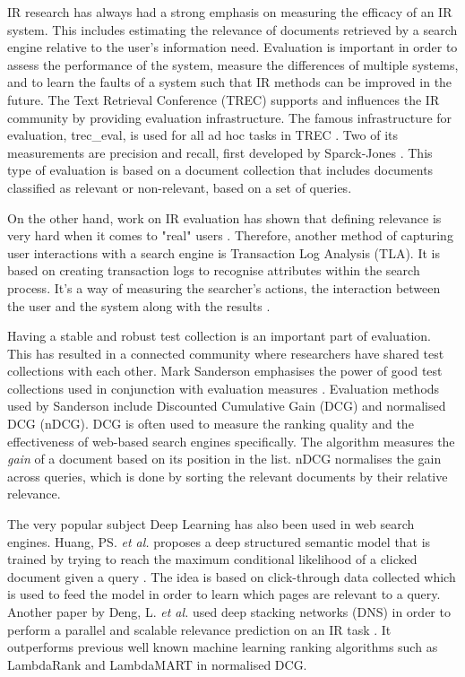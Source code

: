 IR research has always had a strong emphasis on measuring the efficacy of an IR system. This includes estimating the relevance of documents retrieved by a search engine relative to the user's information need. Evaluation is important in order to assess the performance of the system, measure the differences of multiple systems, and to learn the faults of a system such that IR methods can be improved in the future. The Text Retrieval Conference (TREC) supports and influences the IR community by providing evaluation infrastructure. The famous infrastructure for evaluation, trec\_eval, is used for all ad hoc tasks in TREC \cite{voorhees:evaluation}. Two of its measurements are precision and recall, first developed by Sparck-Jones \cite{jones1981information}. This type of evaluation is based on a document collection that includes documents classified as relevant or non-relevant, based on a set of queries.

On the other hand, work on IR evaluation has shown that defining relevance is very hard when it comes to "real" users \cite{mizzaro1997relevance}. Therefore, another method of capturing user interactions with a search engine is Transaction Log Analysis (TLA). It is based on creating transaction logs to recognise attributes within the search process. It's a way of measuring the searcher's actions, the interaction between the user and the system along with the results \cite{glaser1967discovery}. 

Having a stable and robust test collection is an important part of evaluation. This has resulted in a connected community where researchers have shared test collections with each other. Mark Sanderson emphasises the power of good test collections used in conjunction with evaluation measures \cite{sanderson:evaluation}. Evaluation methods used by Sanderson include Discounted Cumulative Gain (DCG) and normalised DCG (nDCG). DCG is often used to measure the ranking quality and the effectiveness of web-based search engines specifically. The algorithm measures the \textit{gain} of a document based on its position in the list. nDCG normalises the gain across queries, which is done by sorting the relevant documents by their relative relevance.

The very popular subject Deep Learning has also been used in web search engines. Huang, PS. \emph{et al.} proposes a deep structured semantic model that is trained by trying to reach the maximum conditional likelihood of a clicked document given a query \cite{huang2013learning}. The idea is based on click-through data collected which is used to feed the model in order to learn which pages are relevant to a query. Another paper by Deng, L. \emph{et al.} used deep stacking networks (DNS) in order to perform a parallel and scalable relevance prediction on an IR task \cite{deng2013deep}. It outperforms previous well known machine learning ranking algorithms such as LambdaRank and LambdaMART \cite{burges2010ranknet} in normalised DCG. 

